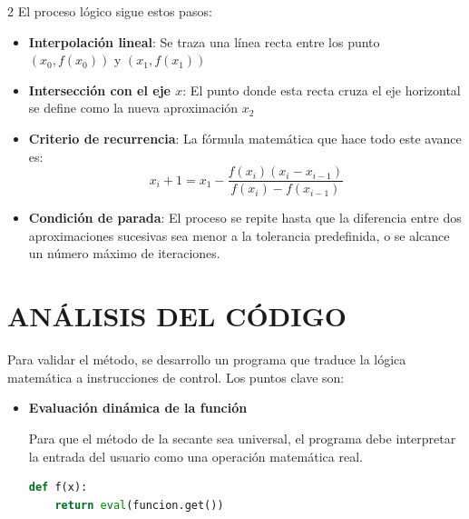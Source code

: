 \documentclass{rmf-d}
\begin{document}
\begin{multicols}{2}
El proceso lógico sigue estos pasos:
\begin{itemize}
    \item \textbf{Interpolación lineal}: Se traza una línea recta entre los punto $(x_0,f(x_0))$ y $(x_1,f(x_1))$
    \item \textbf{Intersección con el eje $x$}: El punto donde esta recta cruza el eje horizontal se define como la nueva aproximación $x_2$
    \item \textbf{Criterio de recurrencia}: La fórmula matemática que hace todo este avance es:
    \begin{equation}
        x_i+1=x_1-\frac{f(x_i)(x_i-x_{i-1})}{f(x_i)-f(x_{i-1})}
    \end{equation}
    \item \textbf{Condición de parada}: El proceso se repite hasta que la diferencia entre dos aproximaciones sucesivas sea menor a la tolerancia predefinida, o se alcance un número máximo de iteraciones. 
\end{itemize}






























\section{ANÁLISIS DEL CÓDIGO}
\label{sec:3}
Para validar el método, se desarrollo un programa que traduce la lógica matemática a instrucciones de control. Los puntos clave son:
\begin{itemize}
    \item \textbf{Evaluación dinámica de la función}

    Para que el método de la secante sea universal, el programa debe interpretar la entrada del usuario como una operación matemática real.
    
    \begin{lstlisting}[language=Python, caption=interpretación de la funcion]
    def f(x):
    return eval(funcion.get())
    \end{lstlisting}


\end{itemize}
\end{multicols}
\end{document}
